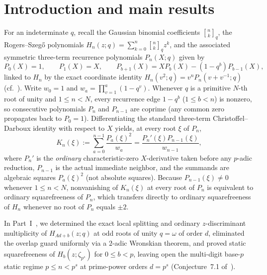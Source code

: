 \documentclass[11pt,reqno]{amsart}
\numberwithin{equation}{section}
\theoremstyle{definition}
\theoremstyle{remark}
\newcommand{\qbin}[2]{\genfrac{[}{]}{0pt}{}{#1}{#2}_q}
\begin{document}
\maketitle

\section{Introduction and main results}
\label{sec:intro}

For an indeterminate $q$, recall the Gaussian binomial coefficients $\qbin{n}{k}$, the Rogers--Szeg\H{o} polynomials $H_n(z;q)=\sum_{k=0}^n\qbin{n}{k}z^k$, and the associated symmetric three-term recurrence polynomials $P_n(X;q)$ given by
\begin{equation}
\label{eq:P-rec}
P_0(X)=1,\qquad P_1(X)=X,\qquad P_{b+1}(X) = XP_b(X) - (1-q^b)P_{b-1}(X),
\end{equation}
linked to $H_n$ by the exact coordinate identity $H_n(v^2;q)=v^n P_n(v+v^{-1};q)$ (cf.~\cite{AKK09,dBS86,KKKKK26rs}). Write $w_0=1$ and $w_a = \prod_{v=1}^a (1-q^v)$. Whenever $q$ is a primitive $N$-th root of unity and $1\le n < N$, every recurrence edge $1-q^b$ ($1\le b<n$) is nonzero, so consecutive polynomials $P_n$ and $P_{n-1}$ are coprime (any common zero propagates back to $P_0=1$). Differentiating the standard three-term Christoffel--Darboux identity with respect to $X$ yields, at every root $\xi$ of $P_n$,
\begin{equation}
\label{eq:CD-kernel}
K_n(\xi) := \sum_{a=0}^{n-1} \frac{P_a(\xi)^2}{w_a} = \frac{P_n'(\xi)P_{n-1}(\xi)}{w_{n-1}},
\end{equation}
where $P_n'$ is the \emph{ordinary} characteristic-zero $X$-derivative taken before any $p$-adic reduction, $P_{n-1}$ is the actual immediate neighbor, and the summands are algebraic squares $P_a(\xi)^2$ (not absolute squares). Because $P_{n-1}(\xi)\ne 0$ whenever $1\le n<N$, nonvanishing of $K_n(\xi)$ at every root of $P_n$ is equivalent to ordinary squarefreeness of $P_n$, which transfers directly to ordinary squarefreeness of $H_n$ whenever no root of $P_n$ equals $\pm 2$.

In Part~I~\cite{KKKKK26rs}, we determined the exact local splitting and ordinary $z$-discriminant multiplicity of $H_{Ad+b}(z;q)$ at odd roots of unity $q=\omega$ of order $d$, eliminated the overlap guard uniformly via a $2$-adic Wronskian theorem, and proved static squarefreeness of $H_b(z;\zeta_{p^s})$ for $0\le b<p$, leaving open the multi-digit base-$p$ static regime $p\le n < p^s$ at prime-power orders $d=p^s$ (Conjecture~7.1 of~\cite{KKKKK26rs}).
\end{document}
